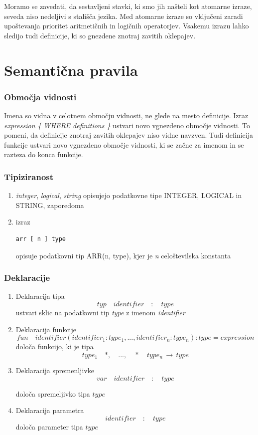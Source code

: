 \documentclass[a4paper, 12p]{book}
\begin{document}
Moramo se zavedati, da sestavljeni stavki, ki smo jih našteli kot atomarne izraze, seveda niso nedeljivi s stališča jezika. Med atomarne izraze so vključeni zaradi upoštevanja prioritet aritmetičnih in logičnih operatorjev. Vsakemu izrazu lahko sledijo tudi definicije, ki so gnezdene znotraj zavitih oklepajev.

\section{Semantična pravila}

\subsubsection{Območja vidnosti}

Imena so vidna v celotnem območju vidnosti, ne glede na mesto definicije. Izraz \textit{expression \{ WHERE definitions \}} ustvari novo vgnezdeno območje vidnosti. To pomeni, da definicije znotraj zavitih oklepajev niso vidne navzven. Tudi definicija funkcije ustvari novo vgnezdeno območje vidnosti, ki se začne za imenom in se razteza do konca funkcije.

\subsubsection{Tipiziranost}

\begin{enumerate}
	\item \textit{integer}, \textit{logical}, \textit{string} opisujejo podatkovne tipe INTEGER, LOGICAL in STRING, zaporedoma
	\item izraz 
\begin{lstlisting}[]
	arr [ n ] type
\end{lstlisting}
	opisuje podatkovni tip ARR(n, type), kjer je \textit{n} celoštevilska konstanta 
\end{enumerate}

\subsubsection{Deklaracije}

\begin{enumerate}
	\item Deklaracija tipa
\[
typ\quad  identifier\quad  :\quad  type
\]
	ustvari sklic na podatkovni tip \textit{type} z imenom \textit{identifier}
	\item Deklaracija funkcije
\[ fun\quad identifier  ( identifier_1 : type_1, ..., identifier_n : type_n ) : type = expression \]
	določa funkcijo, ki je tipa \[type_1 \quad *, \quad  ..., \quad *\quad  type_n \,\to\, type \]
	\item Deklaracija spremenljivke
\[
var \quad identifier\quad :\quad type
\]

določa spremeljivko tipa $type$
	\item Deklaracija parametra
\[
identifier \quad :\quad type
\]
določa parameter tipa $type$
\end{enumerate}
\end{document}
